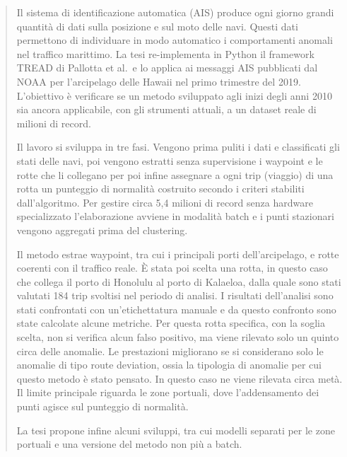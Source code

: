 \begin{abstract}
Il sistema di identificazione automatica (AIS) produce ogni giorno grandi quantità di dati sulla
posizione e sul moto delle navi. Questi dati permettono di individuare in modo automatico i
comportamenti anomali nel traffico marittimo. La tesi re-implementa in Python il framework TREAD
di Pallotta et al.\ e lo applica ai messaggi AIS pubblicati dal NOAA per l'arcipelago delle Hawaii
nel primo trimestre del 2019. L'obiettivo è verificare se un metodo sviluppato agli inizi degli
anni 2010 sia ancora applicabile, con gli strumenti attuali, a un dataset reale di milioni di
record.

Il lavoro si sviluppa in tre fasi. Vengono prima puliti i dati e classificati gli stati delle navi, poi
vengono estratti senza supervisione i waypoint e le rotte che li collegano per poi infine assegnare 
a ogni trip (viaggio) di una rotta un punteggio di normalità costruito secondo i criteri stabiliti dall'algoritmo. 
Per gestire circa 5,4 milioni di record senza hardware specializzato l'elaborazione
avviene in modalità batch e i punti stazionari vengono aggregati prima del clustering.

Il metodo estrae waypoint, tra cui i principali porti dell'arcipelago, e rotte coerenti con il traffico reale. 
È stata poi scelta una rotta, in questo caso che collega il porto di Honolulu al porto di Kalaeloa, 
dalla quale sono stati valutati 184 trip svoltisi nel periodo di analisi. I risultati dell'analisi
sono stati confrontati con un'etichettatura manuale e da questo confronto sono state calcolate alcune metriche.
Per questa rotta specifica, con la soglia scelta, non si verifica alcun falso positivo, ma viene rilevato solo un quinto circa delle anomalie.
Le prestazioni migliorano se si considerano solo le anomalie di tipo route deviation, ossia la tipologia
di anomalie per cui questo metodo è stato pensato. In questo caso ne viene rilevata circa metà.
Il limite principale riguarda le zone portuali, dove l'addensamento dei punti agisce sul punteggio di normalità.

La tesi propone infine alcuni sviluppi, tra cui modelli separati per le zone portuali e una versione del metodo non più a batch.
\end{abstract}
